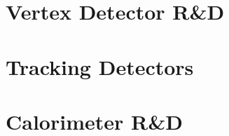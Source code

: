 \documentclass[10pt]{report}
\begin{document}
\tableofcontents

\chapter{Vertex Detector R\&D}







\chapter{Tracking Detectors}



\chapter{Calorimeter R\&D}










\end{document}
